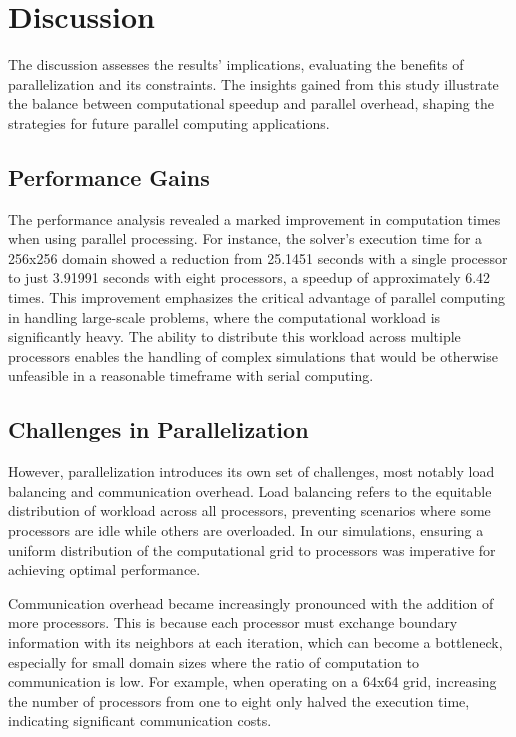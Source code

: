 \documentclass[11pt]{article}
\begin{document}
    \section{Discussion}
    The discussion assesses the results' implications, evaluating the benefits of parallelization and its constraints. The insights gained from this study illustrate the balance between computational speedup and parallel overhead, shaping the strategies for future parallel computing applications.

    \subsection{Performance Gains}
    The performance analysis revealed a marked improvement in computation times when using parallel processing. For instance, the solver's execution time for a 256x256 domain showed a reduction from 25.1451 seconds with a single processor to just 3.91991 seconds with eight processors, a speedup of approximately 6.42 times. This improvement emphasizes the critical advantage of parallel computing in handling large-scale problems, where the computational workload is significantly heavy. The ability to distribute this workload across multiple processors enables the handling of complex simulations that would be otherwise unfeasible in a reasonable timeframe with serial computing.

    \subsection{Challenges in Parallelization}
    However, parallelization introduces its own set of challenges, most notably load balancing and communication overhead. Load balancing refers to the equitable distribution of workload across all processors, preventing scenarios where some processors are idle while others are overloaded. In our simulations, ensuring a uniform distribution of the computational grid to processors was imperative for achieving optimal performance.

    Communication overhead became increasingly pronounced with the addition of more processors. This is because each processor must exchange boundary information with its neighbors at each iteration, which can become a bottleneck, especially for small domain sizes where the ratio of computation to communication is low. For example, when operating on a 64x64 grid, increasing the number of processors from one to eight only halved the execution time, indicating significant communication costs.
\end{document}
